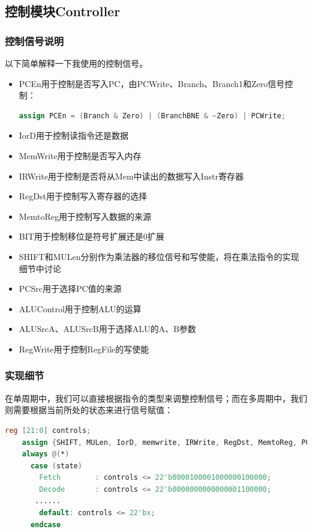 \documentclass[12pt]{article} %
\begin{document}
\begin{sloppypar}
\subsection{控制模块Controller}

\subsubsection{控制信号说明}

以下简单解释一下我使用的控制信号。
\begin{itemize}
\item PCEn用于控制是否写入PC，由PCWrite、Branch、Branch1和Zero信号控制：
\begin{lstlisting}[language=Verilog]  
assign PCEn = (Branch & Zero) | (BranchBNE & ~Zero) | PCWrite;
\end{lstlisting}  
\item IorD用于控制读指令还是数据
\item MemWrite用于控制是否写入内存
\item IRWrite用于控制是否将从Mem中读出的数据写入Instr寄存器
\item RegDst用于控制写入寄存器的选择
\item MemtoReg用于控制写入数据的来源
\item BIT用于控制移位是符号扩展还是0扩展
\item SHIFT和MULen分别作为乘法器的移位信号和写使能，将在乘法指令的实现细节中讨论
\item PCSrc用于选择PC值的来源
\item ALUControl用于控制ALU的运算
\item ALUSrcA、ALUSrcB用于选择ALU的A、B参数
\item RegWrite用于控制RegFile的写使能
\end{itemize}

\subsubsection{实现细节}

在单周期中，我们可以直接根据指令的类型来调整控制信号；而在多周期中，我们则需要根据当前所处的状态来进行信号赋值：
\begin{lstlisting}[language=Verilog]  
reg [21:0] controls;
    assign {SHIFT, MULen, IorD, memwrite, IRWrite, RegDst, MemtoReg, PCWrite, branch, branchBNE, ALUSrcA, RegWrite, BIT, ALUSrcB, PCSrc, aluop} = controls;   
    always @(*)
      case (state)
        Fetch        : controls <= 22'b0000100001000000100000;
        Decode       : controls <= 22'b0000000000000001100000;
	   ......
        default: controls <= 22'bx;
      endcase
\end{lstlisting}  


\end{sloppypar}
\end{document}
